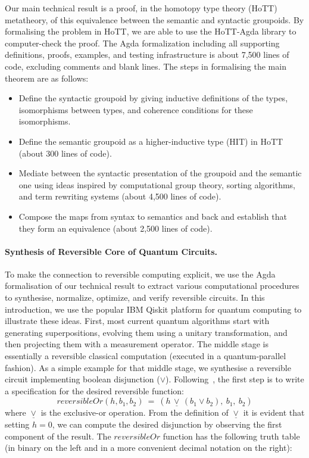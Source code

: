 Our main technical result is a proof, in the homotopy type theory (HoTT) metatheory, of this equivalence between the
semantic and syntactic groupoids. By formalising the problem in HoTT, we are able to use the HoTT-Agda library to
computer-check the proof. The Agda formalization including all supporting definitions, proofs, examples, and testing
infrastructure is about 7,500 lines of code, excluding comments and blank lines. The steps in formalising the main
theorem are as follows:
\begin{itemize}
\item Define the syntactic groupoid by giving inductive definitions of the types, isomorphisms between types, and
  coherence conditions for these isomorphisms.
\item Define the semantic groupoid as a higher-inductive type (HIT) in HoTT (about 300 lines of code).
\item Mediate between the syntactic presentation of the groupoid and the semantic one using ideas inspired by computational
  group theory, sorting algorithms, and term rewriting systems (about 4,500 lines of code).
\item Compose the maps from syntax to semantics and back and establish that they form an equivalence (about 2,500 lines
  of code).
\end{itemize}

\paragraph*{Synthesis of Reversible Core of Quantum Circuits.} To make the connection to reversible computing explicit,
we use the Agda formalisation of our technical result to extract various computational procedures to synthesise,
normalize, optimize, and verify reversible circuits. In this introduction, we use the popular IBM Qiskit platform for
quantum computing to illustrate these ideas. First, most current quantum algorithms start with generating
superpositions, evolving them using a unitary transformation, and then projecting them with a measurement operator. The
middle stage is essentially a reversible classical computation (executed in a quantum-parallel fashion). As a simple
example for that middle stage, we synthesise a reversible circuit implementing boolean disjunction
($\vee$). Following~\citet{Toffoli:1980}, the first step is to write a specification for the desired reversible
function:
\[
\mathit{reversibleOr}(h,b_1,b_2) ~=~ (h \,\underline{\vee}\, (b_1 \vee b_2), ~b_1, ~b_2)
\]
where $\underline{\vee}$ is the exclusive-or operation. From the definition of $\underline{\vee}$ it is evident that setting $h=0$, we can compute the desired disjunction by observing the first component of the result. The $\mathit{reversibleOr}$ function has the following truth table (in binary on the left and in a more convenient decimal notation on the right):

